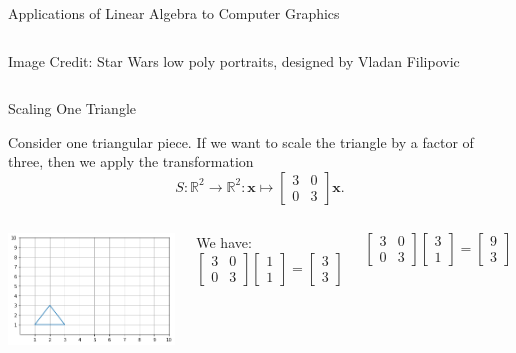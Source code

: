 \documentclass[xcolor=dvipsnames,aspectratio=169,t]{beamer}
\begin{document}
\begin{frame}{Applications of Linear Algebra to Computer Graphics}
\begin{columns}[T]
{\tiny Image Credit: Star Wars low poly portraits, designed by Vladan Filipovic}

\bs


\end{columns}

\end{frame}

\begin{frame}{Scaling One Triangle}

Consider one triangular piece. If we want to scale the triangle by a factor of three, then we apply the transformation
\[ S: \mathbb{R}^2 \to \mathbb{R}^2: \mathbf{x} \mapsto \begin{bmatrix} 3 & 0 \\ 0 & 3 \end{bmatrix} \mathbf{x} .\]

\begin{columns}[T]

\column{0.5\tw}

\includegraphics[width=0.9\tw]{images/fig-triangle-start.png}

\column{0.5\tw}

We have:
\[ \begin{bmatrix} 3 & 0 \\ 0 & 3 \end{bmatrix} \begin{bmatrix} 1 \\ 1 \end{bmatrix} = \begin{bmatrix} 3 \\ 3 \end{bmatrix}\] 

\[ \begin{bmatrix} 3 & 0 \\ 0 & 3 \end{bmatrix} \begin{bmatrix} 3 \\ 1 \end{bmatrix} =  \begin{bmatrix} 9 \\ 3 \end{bmatrix} \] 



\end{columns}
\end{frame}
\end{document}
